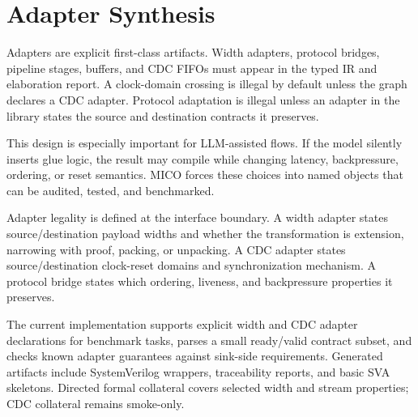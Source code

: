 \section{Adapter Synthesis}

Adapters are explicit first-class artifacts. Width adapters, protocol bridges, pipeline stages, buffers, and CDC FIFOs must appear in the typed IR and elaboration report. A clock-domain crossing is illegal by default unless the graph declares a CDC adapter. Protocol adaptation is illegal unless an adapter in the library states the source and destination contracts it preserves.

This design is especially important for LLM-assisted flows. If the model silently inserts glue logic, the result may compile while changing latency, backpressure, ordering, or reset semantics. MICO forces these choices into named objects that can be audited, tested, and benchmarked.

Adapter legality is defined at the interface boundary. A width adapter states source/destination payload widths and whether the transformation is extension, narrowing with proof, packing, or unpacking. A CDC adapter states source/destination clock-reset domains and synchronization mechanism. A protocol bridge states which ordering, liveness, and backpressure properties it preserves.

The current implementation supports explicit width and CDC adapter declarations for benchmark tasks, parses a small ready/valid contract subset, and checks known adapter guarantees against sink-side requirements. Generated artifacts include SystemVerilog wrappers, traceability reports, and basic SVA skeletons. Directed formal collateral covers selected width and stream properties; CDC collateral remains smoke-only.

